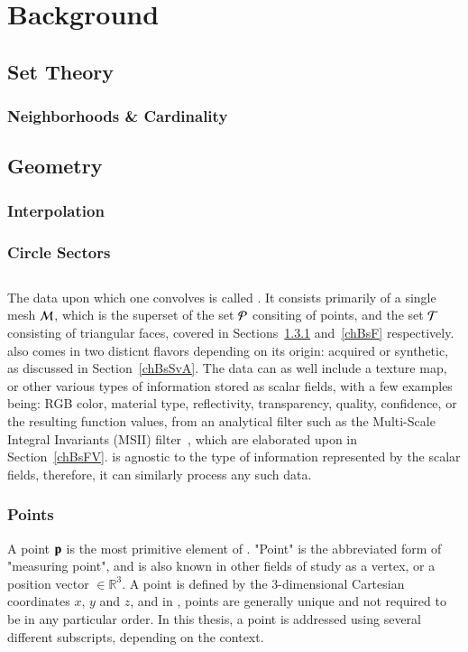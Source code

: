 \chapter{Background}
\section{Set Theory}
\subsection{Neighborhoods \& Cardinality}
%
\section{Geometry}
%
\subsection{Interpolation}
%
\subsection{Circle Sectors}
%
\section{\tdd}
The data upon which one convolves  is called \tdd{}. It consists primarily of a single mesh $\mathcal{M}$, which is the superset of the set $\mathcal{P}$ consiting of points, and the set $\mathcal{T}$ consisting of triangular faces, covered in Sections~\ref{chBsP} and~\ref{chBsF} respectively. \tdd{} also comes in two disticnt flavors depending on its origin: acquired or synthetic, as discussed in Section~\ref{chBsSvA}. The data can as well include a texture map, or other various types of information stored as scalar fields, with a few examples being: RGB color, material type, reflectivity, transparency, quality, confidence, or the resulting function values, from an analytical filter such as the Multi-Scale Integral Invariants (MSII) filter~\cite[p.~21]{Mara12}, which are elaborated upon in Section~\ref{chBsFV}.  is agnostic to the type of information represented by the scalar fields, therefore, it can similarly process any such data.
%
\subsection{Points}
\label{chBsP}
A point $\mathbf{p}$ is the most primitive element of \tdd{}. "Point" is the abbreviated form of "measuring point", and is also known in other fields of study as a vertex, or a position vector $\in \mathbb{R}^3$. A point is defined by the 3-dimensional Cartesian coordinates $x$, $y$ and $z$, and in \tdd{}, points are generally unique and not required to be in any particular order. In this thesis, a point is addressed using several different subscripts, depending on the context.

